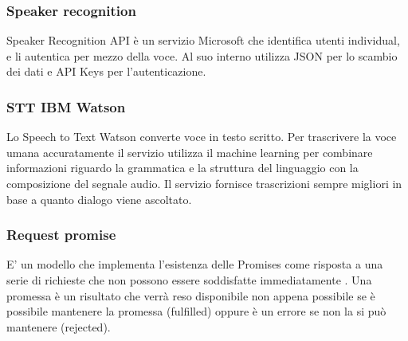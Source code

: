 \subsubsection{Speaker recognition}
Speaker Recognition API è un servizio Microsoft che identifica utenti individual, e li autentica per mezzo della voce. Al suo interno utilizza JSON per lo scambio dei dati e API Keys per l'autenticazione.

\subsubsection{STT IBM Watson}
Lo Speech to Text Watson converte voce in testo scritto. Per trascrivere la voce umana accuratamente il servizio utilizza il machine learning per combinare informazioni riguardo la grammatica e la struttura del linguaggio con la composizione del segnale audio. Il servizio fornisce trascrizioni sempre migliori in base a quanto dialogo viene ascoltato.

\subsubsection{Request promise}
E' un modello che implementa l'esistenza delle Promises come risposta a una serie di richieste che non possono essere soddisfatte immediatamente . Una promessa è un risultato che verrà reso disponibile non appena possibile se è possibile mantenere la promessa (fulfilled) oppure è un errore se non la si può mantenere (rejected).